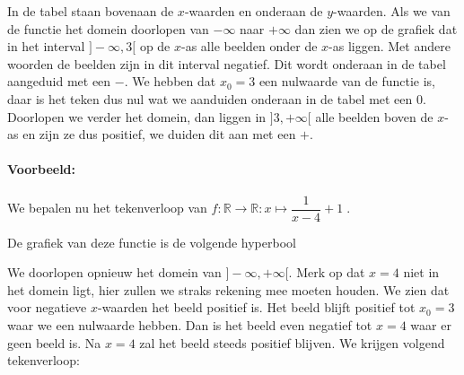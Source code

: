 \documentclass[12pt,twoside]{article}
\begin{document}
In de tabel staan bovenaan de $x$-waarden en onderaan de $y$-waarden. Als we van de functie het domein doorlopen van $-\infty$ naar $+\infty$ dan zien we op de grafiek dat in het interval $]-\infty,3[$ op de $x$-as alle beelden onder de $x$-as liggen. Met andere woorden de beelden zijn in dit interval negatief. Dit wordt onderaan in de tabel aangeduid met een $-$. We hebben dat $x_0=3$ een nulwaarde van de functie is, daar is het teken dus nul wat we aanduiden onderaan in de tabel met een $0$. Doorlopen we verder het domein, dan liggen in $]3,+\infty[$ alle beelden boven de $x$-as en zijn ze dus positief, we duiden dit aan met een $+$.

\pagebreak
\paragraph{Voorbeeld:} We bepalen nu het tekenverloop van $f:\mathbb{R}\to\mathbb{R}:x\mapsto \dfrac{1}{x-4}+1\;.$

De grafiek van deze functie is de volgende hyperbool
\begin{center}
\end{center}

We doorlopen opnieuw het domein van $]-\infty, +\infty[$. Merk op dat $x=4$ niet in het domein ligt, hier zullen we straks rekening mee moeten houden. We zien dat voor negatieve $x$-waarden het beeld positief is. Het beeld blijft positief tot $x_0=3$ waar we een nulwaarde hebben. Dan is het beeld even negatief tot $x=4$ waar er geen beeld is. Na $x=4$ zal het beeld steeds positief blijven. We krijgen volgend tekenverloop:
\end{document}
